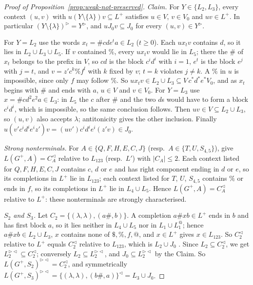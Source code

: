 \documentclass[11pt]{article}
\numberwithin{equation}{section}
\theoremstyle{plain}
\theoremstyle{definition}
\theoremstyle{remark}
\theoremstyle{plain}
\newcommand{\eps}{\lambda}
\newcommand{\R}{^{\rhd}}
\newcommand{\Lc}{^{\lhd}}
\newcommand{\RL}{^{\rhd\lhd}}
\begin{document}
\begin{proof}[Proof of Proposition~\ref{prop:weak-not-preserved}]
\emph{Claim.} For $Y\in\{L_2,L_3\}$, every context $(u,v)$ with
$u(Y\setminus\{\eps\})v\subseteq L^+$ satisfies $u\in V$, $v\in V_0$ and
$uv\in L^+$.  In particular $(Y\setminus\{\eps\})\R=Y\R$, and
$uJ_0v\subseteq J_0$ for every $(u,v)\in Y\R$.

For $Y=L_2$ use the words $x_t=\#cde^ta\in L_2$ ($t\ge0$).  Each $ux_tv$
contains $d$, so it lies in $L_2\cup L_3\cup L_5$.  If $v$ contained $\%$,
every $ux_tv$ would lie in $L_5$; there the $\#$ of $x_t$ belongs to the
prefix in $V$, so $cd$ is the block $c^id^i$ with $i=1$, $e^t$ is the block
$e^j$ with $j=t$, and $v=z'c^k\%f^l$ with $k$ fixed by $v$; $t=k$ violates
$j\ne k$.  A $\%$ in $u$ is impossible, since only $f$ may follow $\%$.  So
$ux_tv\in L_2\cup L_3\subseteq V\,c^*d^*e^*V_0$, and as $x_t$ begins with $\#$
and ends with $a$, $u\in V$ and $v\in V_0$.  For $Y=L_3$ use
$x=\#cd^2e^2a\in L_3$: in $L_5$ the $c$ after $\#$ and the two $d$s would
have to form a block $c^id^i$, which is impossible, so the same conclusion
follows.  Then $uv\in V\subseteq L_2\cup L_3$, so $(u,v)$ also accepts $\eps$;
antitonicity gives the other inclusion.  Finally
$u(v'c^id^ie^iz')v=(uv')c^id^ie^i(z'v)\in J_0$.

\emph{Strong nonterminals.}  For $A\in\{Q,F,H,E,C,J\}$ (resp.\
$A\in\{T,U,S_{4,5}\}$), \citet[proofs of Lemmas~8 and~12]{ky2017} give
$L(G^+,A)=C_A\Lc$ relative to $L_{123}$ (resp.\ $L'$) with $|C_A|\le2$.  Each
context listed for $Q,F,H,E,C,J$ contains $c$, $d$ or $e$ and has right
component ending in $d$ or $e$, so its completions in $L^+$ lie in $L_{123}$; each
context listed for $T$, $U$, $S_{4,5}$ contains $\%$ or ends in $f$, so its
completions in $L^+$ lie in $L_4\cup L_5$.  Hence $L(G^+,A)=C_A\Lc$ relative
to $L^+$: these nonterminals are strongly characterised.

\emph{$S_2$ and $S_3$.}  Let $C_2=\{(\eps,\eps),(a\#,b)\}$.  A completion
$a\#xb\in L^+$ ends in $b$ and has first block $a$, so it lies neither in
$L_4\cup L_5$ nor in $L_1\cup L_1^@$; hence $a\#xb\in L_2\cup L_3$, $x$
contains none of $\$,\%,f,@$, and $x\in L^+$ gives $x\in L_{123}$.  So $C_2\Lc$
relative to $L^+$ equals $C_2\Lc$ relative to $L_{123}$, which is $L_2\cup J_0$
\citep[proof of Lemma~8]{ky2017}.  Since $L_2\subseteq C_2\Lc$, we get
$L_2\RL\subseteq C_2\Lc$; conversely $L_2\subseteq L_2\RL$, and
$J_0\subseteq L_2\RL$ by the Claim.  So $L(G^+,S_2)\RL=C_2\Lc$, and
symmetrically $L(G^+,S_3)\RL=\{(\eps,\eps),(b\#,a)\}\Lc=L_3\cup J_0$.


\end{proof}
\end{document}
